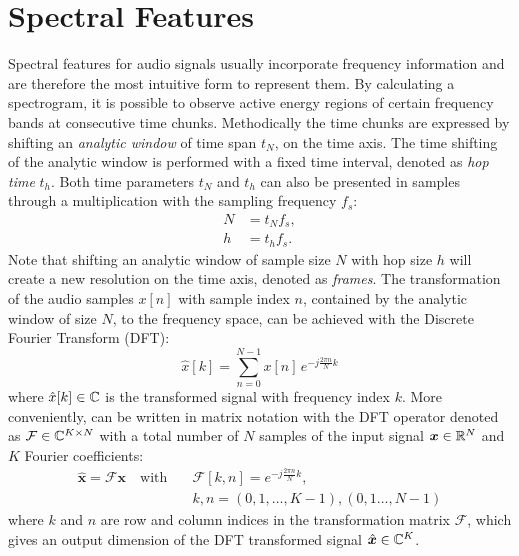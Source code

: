 
\section{Spectral Features}\label{sec:signal_spec}
Spectral features for audio signals usually incorporate frequency information and are therefore the most intuitive form to represent them.
By calculating a spectrogram, it is possible to observe active energy regions of certain frequency bands at consecutive time chunks.
Methodically the time chunks are expressed by shifting an \emph{analytic window} of time span $t_N$, on the time axis.
The time shifting of the analytic window is performed with a fixed time interval, denoted as \emph{hop time} $t_{h}$.
Both time parameters $t_N$ and $t_h$ can also be presented in samples through a multiplication with the sampling frequency $f_s$:
\begin{equation}
  \begin{split}
    N &= t_N f_s, \\
    h &= t_h f_s.
  \end{split}
\end{equation}
Note that shifting an analytic window of sample size $N$ with hop size $h$ will create a new resolution on the time axis, denoted as \emph{frames}.
The transformation of the audio samples $x[n]$ with sample index $n$, contained by the analytic window of size $N$, to the frequency space, can be achieved with the Discrete Fourier Transform (DFT):
\begin{equation}\label{eq:signal_spec_dtft}
  \hat{x}[k] = \sum_{n=0}^{N-1} x[n] \, e^{-j\frac{2 \pi n}{N}k}
\end{equation}
where $\hat{x}[k] \in \mathbb{C}$ is the transformed signal with frequency index $k$.
More conveniently,  can be written in matrix notation with the DFT operator denoted as $\mathcal{F} \in \mathbb{C}^{K \times N}$ with a total number of $N$ samples of the input signal $\bm{x} \in \mathbb{R}^N$ and $K$ Fourier coefficients:
\begin{equation}\label{eq:signal_spec_dtft_matrix}
  \begin{aligned}
    \hat{\bm{x}} = \mathcal{F} \bm{x} \quad \mathrm{with} 
    \quad &\mathcal{F}[k, n] = e^{-j\frac{2 \pi n}{N} k},\\
    &k, n = (0, 1, \dots, K-1), (0, 1 \dots, N-1)
  \end{aligned}
\end{equation}
where $k$ and $n$ are row and column indices in the transformation matrix $\mathcal{F}$, which gives an output dimension of the DFT transformed signal $\hat{\bm{x}} \in \mathbb{C}^K$.

